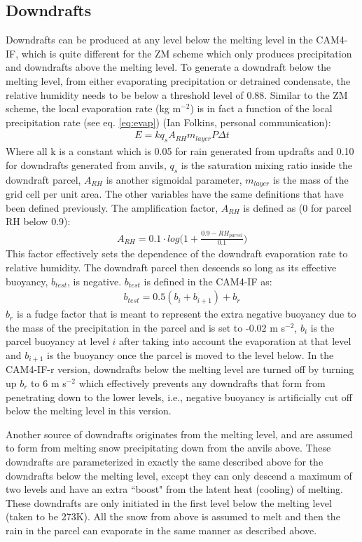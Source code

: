 \documentclass[letterpaper,12pt,titlepage,oneside,final]{book}
\begin{document}
\subsection{Downdrafts}\label{ifdown}
Downdrafts can be produced at any level below the melting level in the CAM4-IF, which is quite different for the ZM scheme which only produces precipitation and downdrafts above the melting level. To generate a downdraft below the melting level, from either evaporating precipitation or detrained condensate, the relative humidity needs to be below a threshold level of 0.88. Similar to the ZM scheme, the local evaporation rate (kg m$^{-2}$) is in fact a function of the local precipitation rate (see eq. \ref{eq:evap}) (Ian Folkins, personal communication):
\begin{align}
E=kq_{s}A_{RH}m_{layer}P\Delta{t}
\end{align}
Where all k is a constant which is 0.05 for rain generated from updrafts and 0.10 for downdrafts generated from anvils, $q_{s}$ is the saturation mixing ratio inside the downdraft parcel, $A_{RH}$ is another sigmoidal parameter, $m_{layer}$ is the mass of the grid cell per unit area. The other variables have the same definitions that have been defined previously. The amplification factor, $A_{RH}$ is defined as (0 for parcel RH below 0.9):
\begin{align}
A_{RH}=0.1\cdot{log}\bigg(1+\frac{0.9-RH_{parcel}}{0.1}\bigg)
\end{align} 
This factor effectively sets the dependence of the downdraft evaporation rate to relative humidity. The downdraft parcel then descends so long as its effective buoyancy, $b_{test}$, is negative. $b_{test}$ is defined in the CAM4-IF as:
\begin{align}
b_{test}=0.5(b_{i}+b_{i+1})+b_{r}
\end{align}
$b_{r}$ is a fudge factor that is meant to represent the extra negative buoyancy due to the mass of the precipitation in the parcel and is set to -0.02 m s$^{-2}$, $b_{i}$ is the parcel buoyancy at level $i$ after taking into account the evaporation at that level and $b_{i+1}$ is the buoyancy once the parcel is moved to the level below. In the CAM4-IF-r version, downdrafts below the melting level are turned off by turning up $b_{r}$ to 6 m s$^{-2}$ which effectively prevents any downdrafts that form from penetrating down to the lower levels, i.e., negative buoyancy is artificially cut off below the melting level in this version. 

Another source of downdrafts originates from the melting level, and are assumed to form from melting snow precipitating down from the anvils above. These downdrafts are parameterized in exactly the same described above for the downdrafts below the melting level, except they can only descend a maximum of two levels and have an extra ``boost" from the latent heat (cooling) of melting. These downdrafts are only initiated in the first level below the melting level (taken to be 273K). All the snow from above is assumed to melt and then the rain in the parcel can evaporate in the same manner as described above.
\end{document}

